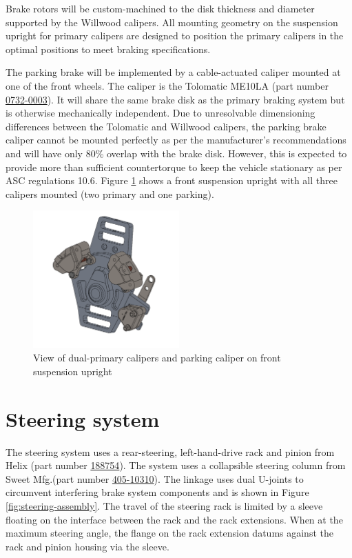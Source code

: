 \documentclass[10pt]{article}
\begin{document}
Brake rotors will be custom-machined to the disk thickness and diameter supported by the Willwood calipers. All mounting geometry on the suspension upright for primary calipers are designed to position the primary calipers in the optimal positions to meet braking specifications.

The parking brake will be implemented by a cable-actuated caliper mounted at one of the front wheels. The caliper is the Tolomatic ME10LA (part number \href{https://www.tolomatic.com/products/product-details/me10-mechanical-disc-brake#/specs-order}{0732-0003}). It will share the same brake disk as the primary braking system but is otherwise mechanically independent. Due to unresolvable dimensioning differences between the Tolomatic and Willwood calipers, the parking brake caliper cannot be mounted perfectly as per the manufacturer's recommendations and will have only 80\% overlap with the brake disk. However, this is expected to provide more than sufficient countertorque to keep the vehicle stationary as per ASC regulations 10.6. Figure \ref{fig:calipers-mounting-geometry} shows a front suspension upright with all three calipers mounted (two primary and one parking).

\begin{figure}[H]
\centering
\includegraphics[width=0.5\textwidth]{figures/caliper-mounting-geometry}
\caption{View of dual-primary calipers and parking caliper on front suspension upright }
\label{fig:calipers-mounting-geometry}
\end{figure}

\section{Steering system}
The steering system uses a rear-steering, left-hand-drive rack and pinion from Helix (part number \href{http://www.helixsuspension.com/catalog/Steering/Manual-Steering-Racks/HEXSR5/Omni-Manual-Steering-Rack---Rear-Steering}{188754}). The system uses a collapsible steering column from Sweet Mfg.\@ (part number \href{https://sweetmfg.biz/product.php?productid=2836}{405-10310}). The linkage uses dual U-joints to circumvent interfering brake system components and is shown in Figure \ref{fig:steering-assembly}. The travel of the steering rack is limited by a sleeve floating on the interface between the rack and the rack extensions. When at the maximum steering angle, the flange on the rack extension datums against the rack and pinion housing via the sleeve.
\end{document}
